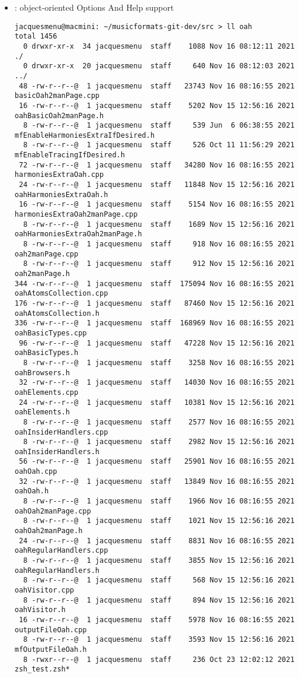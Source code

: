 \begin{itemize}
\item {} : object-oriented Options And Help support
\begin{lstlisting}[language=Terminal]
jacquesmenu@macmini: ~/musicformats-git-dev/src > ll oah
total 1456
  0 drwxr-xr-x  34 jacquesmenu  staff    1088 Nov 16 08:12:11 2021 ./
  0 drwxr-xr-x  20 jacquesmenu  staff     640 Nov 16 08:12:03 2021 ../
 48 -rw-r--r--@  1 jacquesmenu  staff   23743 Nov 16 08:16:55 2021 basicOah2manPage.cpp
 16 -rw-r--r--@  1 jacquesmenu  staff    5202 Nov 15 12:56:16 2021 oahBasicOah2manPage.h
  8 -rw-r--r--@  1 jacquesmenu  staff     539 Jun  6 06:38:55 2021 mfEnableHarmoniesExtraIfDesired.h
  8 -rw-r--r--@  1 jacquesmenu  staff     526 Oct 11 11:56:29 2021 mfEnableTracingIfDesired.h
 72 -rw-r--r--@  1 jacquesmenu  staff   34280 Nov 16 08:16:55 2021 harmoniesExtraOah.cpp
 24 -rw-r--r--@  1 jacquesmenu  staff   11848 Nov 15 12:56:16 2021 oahHarmoniesExtraOah.h
 16 -rw-r--r--@  1 jacquesmenu  staff    5154 Nov 16 08:16:55 2021 harmoniesExtraOah2manPage.cpp
  8 -rw-r--r--@  1 jacquesmenu  staff    1689 Nov 15 12:56:16 2021 oahHarmoniesExtraOah2manPage.h
  8 -rw-r--r--@  1 jacquesmenu  staff     918 Nov 16 08:16:55 2021 oah2manPage.cpp
  8 -rw-r--r--@  1 jacquesmenu  staff     912 Nov 15 12:56:16 2021 oah2manPage.h
344 -rw-r--r--@  1 jacquesmenu  staff  175094 Nov 16 08:16:55 2021 oahAtomsCollection.cpp
176 -rw-r--r--@  1 jacquesmenu  staff   87460 Nov 15 12:56:16 2021 oahAtomsCollection.h
336 -rw-r--r--@  1 jacquesmenu  staff  168969 Nov 16 08:16:55 2021 oahBasicTypes.cpp
 96 -rw-r--r--@  1 jacquesmenu  staff   47228 Nov 15 12:56:16 2021 oahBasicTypes.h
  8 -rw-r--r--@  1 jacquesmenu  staff    3258 Nov 16 08:16:55 2021 oahBrowsers.h
 32 -rw-r--r--@  1 jacquesmenu  staff   14030 Nov 16 08:16:55 2021 oahElements.cpp
 24 -rw-r--r--@  1 jacquesmenu  staff   10381 Nov 15 12:56:16 2021 oahElements.h
  8 -rw-r--r--@  1 jacquesmenu  staff    2577 Nov 16 08:16:55 2021 oahInsiderHandlers.cpp
  8 -rw-r--r--@  1 jacquesmenu  staff    2982 Nov 15 12:56:16 2021 oahInsiderHandlers.h
 56 -rw-r--r--@  1 jacquesmenu  staff   25901 Nov 16 08:16:55 2021 oahOah.cpp
 32 -rw-r--r--@  1 jacquesmenu  staff   13849 Nov 16 08:16:55 2021 oahOah.h
  8 -rw-r--r--@  1 jacquesmenu  staff    1966 Nov 16 08:16:55 2021 oahOah2manPage.cpp
  8 -rw-r--r--@  1 jacquesmenu  staff    1021 Nov 15 12:56:16 2021 oahOah2manPage.h
 24 -rw-r--r--@  1 jacquesmenu  staff    8831 Nov 16 08:16:55 2021 oahRegularHandlers.cpp
  8 -rw-r--r--@  1 jacquesmenu  staff    3855 Nov 15 12:56:16 2021 oahRegularHandlers.h
  8 -rw-r--r--@  1 jacquesmenu  staff     568 Nov 15 12:56:16 2021 oahVisitor.cpp
  8 -rw-r--r--@  1 jacquesmenu  staff     894 Nov 15 12:56:16 2021 oahVisitor.h
 16 -rw-r--r--@  1 jacquesmenu  staff    5978 Nov 16 08:16:55 2021 outputFileOah.cpp
  8 -rw-r--r--@  1 jacquesmenu  staff    3593 Nov 15 12:56:16 2021 mfOutputFileOah.h
  8 -rwxr--r--@  1 jacquesmenu  staff     236 Oct 23 12:02:12 2021 zsh_test.zsh*
\end{lstlisting}


\end{itemize}
